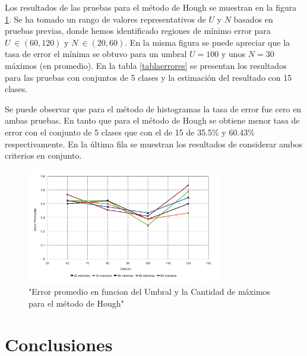 \documentclass[conference,spanish,a4paper,10pt,oneside,final]{tfmpd}
\begin{document}
Los resultados de las pruebas para el método de Hough se muestran en la figura \ref{graficaerror}.
Se ha tomado un rango de valores representativos de $U$ y $N$ basados en pruebas previas, donde 
hemos identificado regiones de mínimo error para $U~\in(60,120)$ y $N~\in(20,60)$.
En la misma figura se puede apreciar que la tasa de error el mínima se obtuvo para un umbral $U = 100$ 
y unos $N = 30$ máximos (en promedio).
%
En la tabla \ref{tablaerrores} se presentan los resultados para las pruebas con conjuntos de 5
clases y la estimación del resultado con 15 clases. 

Se puede observar que para el método de histogramas la tasa de error fue cero en
ambas pruebas. En tanto que para el método de Hough se obtiene menor tasa de error con el
conjunto de 5 clases que con el de 15 de 35.5\% y 60.43\% respectivamente.
En la última fila se muestran los resultados de considerar ambos criterios en conjunto. 

\begin{figure}
\begin{center}
\includegraphics[width=8.5cm]{../diagramas/estadistica_noche_iguales} 
\end{center}
\caption{"Error promedio en funcion del Umbral y la Cantidad de máximos para el método de Hough"}
\label{graficaerror}
\end{figure}
%
%
%
%
\section{Conclusiones}

%
%
%
%
\end{document}
